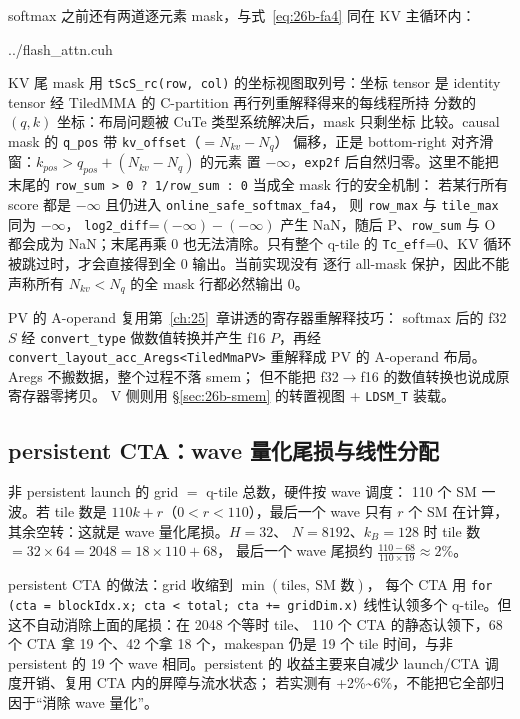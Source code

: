 softmax 之前还有两道逐元素 mask，与式~\eqref{eq:26b-fa4} 同在 KV 主循环内：

\begin{lstinputlisting}[linerange={3932-3967},firstnumber=auto,
  title={flash\_attn.cuh L3932-3967（双 mask：KV 尾部越界列 + causal 滑窗）}]{../flash_attn.cuh}
\end{lstinputlisting}

KV 尾 mask 用 \texttt{tScS\_rc(row, col)} 的坐标视图取列号：坐标 tensor 是
identity tensor 经 TiledMMA 的 C-partition 再行列重解释得来的每线程所持
分数的 $(q, k)$ 坐标：布局问题被 CuTe 类型系统解决后，mask 只剩坐标
比较。causal mask 的 \texttt{q\_pos} 带 \texttt{kv\_offset}（$=N_{kv}-N_q$）
偏移，正是 bottom-right 对齐滑窗：$k_{pos} > q_{pos} + (N_{kv}-N_q)$ 的元素
置 $-\infty$，\texttt{exp2f} 后自然归零。这里不能把末尾的
\texttt{row\_sum > 0 ? 1/row\_sum : 0} 当成全 mask 行的安全机制：
若某行所有 score 都是 $-\infty$ 且仍进入 \texttt{online\_safe\_softmax\_fa4}，
则 \texttt{row\_max} 与 \texttt{tile\_max} 同为 $-\infty$，
\texttt{log2\_diff}=$(-\infty)-(-\infty)$ 产生 NaN，随后 P、\texttt{row\_sum}
与 O 都会成为 NaN；末尾再乘 0 也无法清除。只有整个 q-tile 的
\texttt{Tc\_eff}=0、KV 循环被跳过时，才会直接得到全 0 输出。当前实现没有
逐行 all-mask 保护，因此不能声称所有 $N_{kv}{<}N_q$ 的全 mask 行都必然输出 0。

PV 的 A-operand 复用第~\ref{ch:25}~章讲透的寄存器重解释技巧：
softmax 后的 f32 \(S\) 经 \texttt{convert\_\allowbreak{}type} 做数值转换并产生
f16 \(P\)，再经 \texttt{convert\_\allowbreak{}layout\_\allowbreak{}acc\_\allowbreak{}Aregs<TiledMmaPV>}
重解释成 PV 的 A-operand 布局。Aregs 不搬数据，整个过程不落 smem；
但不能把 f32$\to$f16 的数值转换也说成原寄存器零拷贝。
V 侧则用 \S\ref{sec:26b-smem} 的转置视图 + \texttt{LDSM\_T} 装载。

\subsection{persistent CTA：wave 量化尾损与线性分配}\label{sec:26b-persistent}

非 persistent launch 的 grid $=$ q-tile 总数，硬件按 wave 调度：
110 个 SM 一波。若 tile 数是 $110k + r$（$0<r<110$），最后一个 wave 只有
$r$ 个 SM 在计算，其余空转：这就是 wave 量化尾损。$H{=}32$、
$N{=}8192$、$k_B{=}128$ 时 tile 数 $= 32\times 64 = 2048 = 18\times 110 + 68$，
最后一个 wave 尾损约 $\tfrac{110-68}{110\times 19} \approx 2\%$。

persistent CTA 的做法：grid 收缩到 $\min(\text{tiles},\ \text{SM 数})$，
每个 CTA 用 \texttt{for (cta = blockIdx.x; cta < total; cta += gridDim.x)}
线性认领多个 q-tile。但这不自动消除上面的尾损：在 2048 个等时 tile、
110 个 CTA 的静态认领下，68 个 CTA 拿 19 个、42 个拿 18 个，makespan
仍是 19 个 tile 时间，与非 persistent 的 19 个 wave 相同。persistent 的
收益主要来自减少 launch/CTA 调度开销、复用 CTA 内的屏障与流水状态；
若实测有 +2\%\textasciitilde6\%，不能把它全部归因于“消除 wave 量化”。

